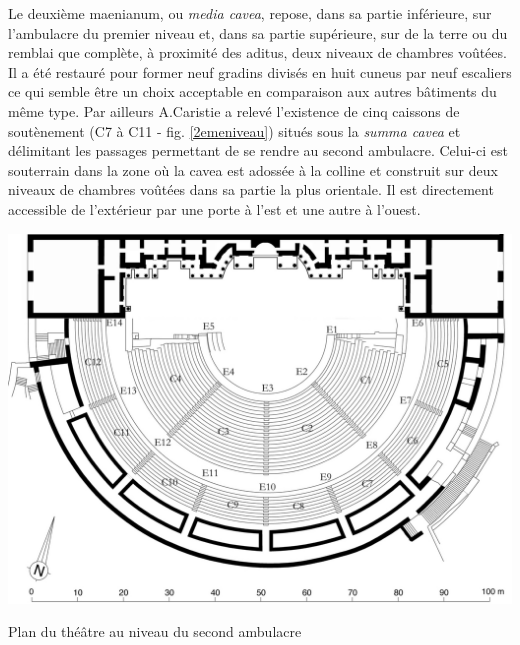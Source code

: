 		Le deuxième \gls{maenianum}, ou \textit{media cavea}, repose, dans sa partie inférieure, sur l'\gls{ambulacre} du premier niveau et, dans sa partie supérieure, sur de la terre ou du remblai que complète, à proximité des \gls{aditus}, deux niveaux de chambres voûtées. Il a été restauré pour former neuf gradins divisés en huit \gls{cuneus} par neuf escaliers ce qui semble être un choix acceptable en comparaison aux autres bâtiments du même type. Par ailleurs A.Caristie a relevé l'existence de cinq caissons de soutènement (C7 à C11 - fig. \ref{2emeniveau}) situés sous la \textit{summa cavea} et délimitant les passages permettant de se rendre au second \gls{ambulacre}. Celui-ci est souterrain dans la zone où la \gls{cavea} est adossée à la colline et construit sur deux niveaux de chambres voûtées dans sa partie la plus orientale. Il est directement accessible de l'extérieur par une porte à l'est et une autre à l'ouest.
		
	\begin{figureth}
		\includegraphics[width=\linewidth]{images/2emeniveau}
		\caption[Vue de dessus - 2ème niveau]{Plan du théâtre au niveau du second \gls{ambulacre} \cite[Pl. XVIII et XX fusionnées]{orangePl}}
		\label{2emeniveau}
	\end{figureth}		
		
